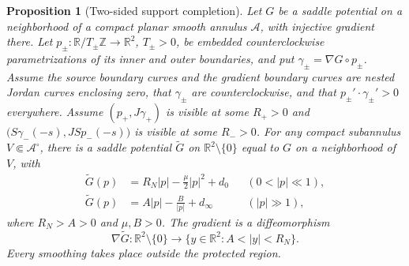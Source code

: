 \documentclass[11pt]{amsart}
\newtheorem{proposition}[theorem]{Proposition}
\theoremstyle{definition}
\theoremstyle{remark}
\newcommand{\R}{\mathbb R}\newcommand{\Sph}{\mathbb S}
\numberwithin{equation}{section}
\begin{document}
\begin{proposition}[Two-sided support completion]\label{prop:dual-radial-completion}
Let $G$ be a saddle potential on a neighborhood of a compact planar
smooth annulus $\mathcal A$, with injective gradient there. Let
$p_\pm:\R/T_\pm\mathbb Z\to\R^2$, $T_\pm>0$, be embedded
counterclockwise parametrizations of its inner and outer boundaries, and put
$\gamma_\pm=\nabla G\circ p_\pm$. Assume the source boundary curves
and the gradient boundary curves are nested Jordan curves enclosing
zero, that $\gamma_\pm$ are counterclockwise, and that
$p_\pm'\cdot\gamma_\pm'>0$ everywhere. Assume
$(p_+,J\gamma_+)$ is visible at some $R_+>0$ and
$\bigl(S\gamma_-(-s),JS p_-(-s)\bigr)$ is visible at some $R_->0$.
For any compact subannulus $V\Subset\mathcal A^\circ$, there is a saddle
potential $\widetilde G$ on $\mathbb R^2\setminus\{0\}$ equal to $G$
on a neighborhood of $V$, with
\begin{equation}\label{eq:radial-two-ends}
 \begin{aligned}
 \widetilde G(p)&=R_N|p|-\frac\mu2|p|^2+d_0
     && (0<|p|\ll1),\\
 \widetilde G(p)&=A|p|-\frac B{|p|}+d_\infty
     && (|p|\gg1),
 \end{aligned}
\end{equation}
where $R_N>A>0$ and $\mu,B>0$. The gradient is a
diffeomorphism
\begin{equation}\label{eq:full-gradient-annulus}
 \nabla\widetilde G:\mathbb R^2\setminus\{0\}
       \longrightarrow \{y\in\mathbb R^2:A<|y|<R_N\}.
\end{equation}
Every smoothing takes place outside the protected region.
\end{proposition}
\end{document}

